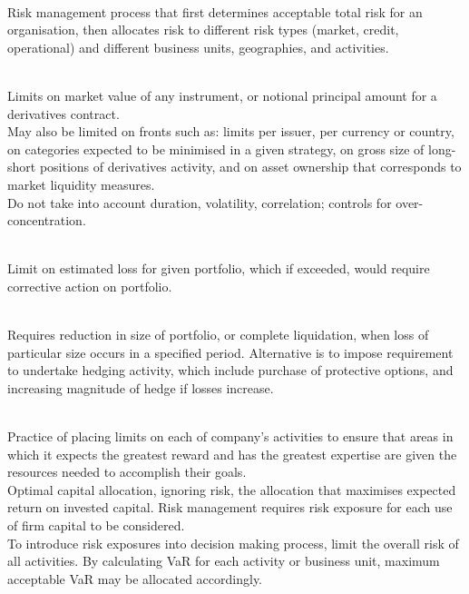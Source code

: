 \begin{remark} \\
Risk management process that first determines acceptable total risk for an organisation, then allocates risk to different risk types (market, credit, operational) and different business units, geographies, and activities.
\end{remark}

\begin{remark} \\
Limits on market value of any instrument, or notional principal amount for a derivatives contract.\\
May also be limited on fronts such as: limits per issuer, per currency or country, on categories expected to be minimised in a given strategy, on gross size of long-short positions of derivatives activity, and on asset ownership that corresponds to market liquidity measures.\\
Do not take into account duration, volatility, correlation; controls for over-concentration.
\end{remark}

\begin{remark} \\
Limit on estimated loss for given portfolio, which if exceeded, would require corrective action on portfolio.
\end{remark}

\begin{remark} \\
Requires reduction in size of portfolio, or complete liquidation, when loss of particular size occurs in a specified period. Alternative is to impose requirement to undertake hedging activity, which include purchase of protective options, and increasing magnitude of hedge if losses increase.
\end{remark}

\begin{remark} \\
Practice of placing limits on each of company's activities to ensure that areas in which it expects the greatest reward and has the greatest expertise are given the resources needed to accomplish their goals.\\
Optimal capital allocation, ignoring risk, the allocation that maximises expected return on invested capital. Risk management requires risk exposure for each use of firm capital to be considered.\\
To introduce risk exposures into decision making process, limit the overall risk of all activities. By calculating VaR for each activity or business unit, maximum acceptable VaR may be allocated accordingly.
\end{remark}

